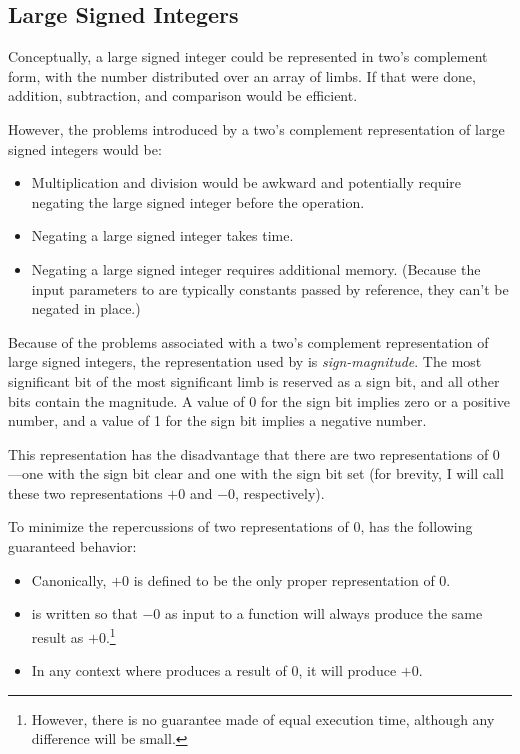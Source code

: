 \subsection{Large Signed Integers}
\label{cldd0:srnm0:srls0}

Conceptually, a large signed integer could be represented in 
two's complement form, with the 
number distributed over an array of limbs.  If that were 
done, addition, subtraction, and comparison would be 
efficient.  

However, the problems introduced by a two's complement 
representation of large signed integers would be: 

\begin{itemize}
\item Multiplication and division would be awkward and
      potentially require negating the large signed integer
      before the
      operation.
\item Negating a large signed integer takes time.
\item Negating a large signed integer requires additional
      memory\@.  (Because
      the input parameters to \emph{\productbasenameshort{}}
      are typically
      constants passed by reference, they can't be negated
      in place.)
\end{itemize}

Because of the problems associated with a two's complement 
representation of large signed integers, the representation 
used by \emph{\productbasenameshort{}} is 
\emph{sign-magnitude}.  The most 
significant bit of the most significant limb is reserved as 
a sign bit, and all other bits contain the magnitude.  A 
value of 0 for the sign bit implies zero or a positive 
number, and a value of 1 for the sign bit implies a negative 
number.  

This representation has the disadvantage that there are two 
representations of 0---one with the sign bit clear and one 
with the sign bit set (for brevity, I will call these two 
representations $+0$ and $-0$, respectively).  

To minimize the repercussions of two representations of 0, 
\emph{\productbasenameshort{}} has the following guaranteed 
behavior: 

\begin{itemize}
\item Canonically, $+0$ is defined to be the only proper
      representation of 0.
\item \emph{\productbasenameshort{}} is written so that
      $-0$ as input to a
      function will always
      produce the same result as $+0$.\footnote{However,
      there
      is no guarantee made of equal execution time,
      although any difference
      will be small.}
\item In any context where \emph{\productbasenameshort{}}
      produces a result
      of 0, it will produce $+0$.
\end{itemize}


